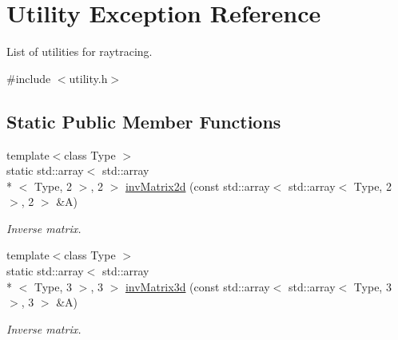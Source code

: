 \hypertarget{exceptionUtility}{\section{Utility Exception Reference}
\label{exceptionUtility}
}


List of utilities for raytracing.  




{\ttfamily \#include $<$utility.\-h$>$}

\subsection*{Static Public Member Functions}
\begin{DoxyCompactItemize}
\item 
{\footnotesize template$<$class Type $>$ }\\static std\-::array$<$ std\-::array\\*
$<$ Type, 2 $>$, 2 $>$ \hyperlink{exceptionUtility_a1873b248b7e37b48532c512eb19d037b}{inv\-Matrix2d} (const std\-::array$<$ std\-::array$<$ Type, 2 $>$, 2 $>$ \&A)
\begin{DoxyCompactList}\small\item\em Inverse matrix. \end{DoxyCompactList}\item 
{\footnotesize template$<$class Type $>$ }\\static std\-::array$<$ std\-::array\\*
$<$ Type, 3 $>$, 3 $>$ \hyperlink{exceptionUtility_a3b7516865a1c4621f4b9807fea8ce67a}{inv\-Matrix3d} (const std\-::array$<$ std\-::array$<$ Type, 3 $>$, 3 $>$ \&A)
\begin{DoxyCompactList}\small\item\em Inverse matrix. \end{DoxyCompactList}\end{DoxyCompactItemize}
